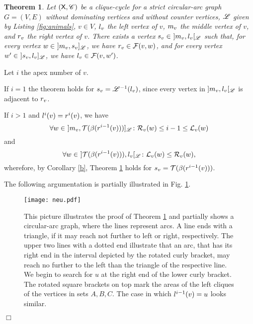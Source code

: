 \documentclass[10pt]{article}
\newtheorem{theorem}{Theorem}[section]
\newenvironment{proof}{\noindent{\bf Proof~}}{\null\hfill $\Box$\par\medskip}
\newcommand{\rvv}{\rv{v}}
\newcommand{\mvv}{\mv{v}}
\newcommand{\svv}{s_v}
\begin{document}
\begin{theorem}\label{separator}
Let $(\mc{X},\ri{C})$ be a clique-cycle for a strict circular-arc graph $G=(V,E)$ without 
dominating vertices and without counter vertices, $\ri{L}$ given by 
Listing \ref{fig:animals}, $v\in V$,  $\lvv$ the left 
vertex of $v$, $\mvv$ the middle vertex of $v$, and $\rvv$ the right vertex of $v$.
There exists a vertex $\svv\in~]\mvv,\lvv[_\ri{L}$ such that, for 
every vertex $w\in~]\mvv,\svv]_\ri{L}$, we have $\rvv\in\fe{v}{w}$, and 
for every vertex $w'\in~]\svv,\lvv]_\ri{L}$, 
we have $\lvv\in\fe{v}{w'}$.
\end{theorem}




\begin{proof}
Let $i$ the apex number of $v$.

If $i=1$ the theorem holds for $\svv=\ri{L}^{-1}(\lvv)$, since every vertex in 
$]\mvv,\lvv[_\ri{L}$ is adjacent to $\rvv$.

If $i>1$ and $\lvi{v}{i}=\rvi{v}{i}$, we have
$$\forall w\in~]\mvv, \last{\rc{\rvi{v}{i-1}}}]_\ri{L}\colon\rvd{w}\leq i-1\leq\lvd{w}$$
and
$$\forall w\in~]\last{\rc{\rvi{v}{i-1}}},\lvv[_\ri{L}\colon\lvd{w}\leq\rvd{w},$$
wherefore, by Corollary \ref{b}, Theorem \ref{separator} holds for $\svv=\last{\rc{\rvi{v}{i-1}}}$.



The following argumentation is partially illustrated in Fig. \ref{neu}.
\begin{figure}[t]
\begin{center}
\texttt{[image: neu.pdf]}
\end{center}
\caption{
This picture illustrates the proof of Theorem \ref{separator} and partially shows a 
circular-arc graph, where the lines represent arcs.
A line ends with a triangle, if it may reach not further to left or right, respectively.
The upper two lines with a dotted end illustrate that an arc, that has its right end in 
the interval depicted by the rotated 
curly bracket, may reach no further to the left than the triangle of the respective line.
We begin to search for $u$ at the right end of the lower curly bracket.
The rotated square brackets on top mark the areas of the left cliques of 
the vertices in sets $A,B,C$.
The case in which $\lvi{v}{i-1}= u$ looks similar.
}
\label{neu}
\end{figure}






\end{proof}
\end{document}
